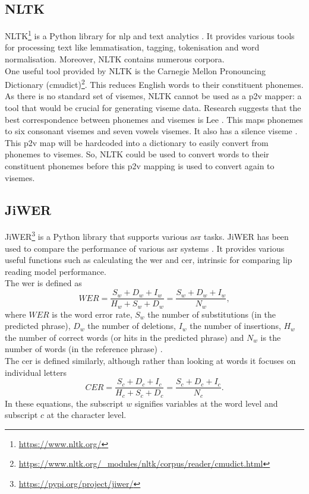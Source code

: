 \subsection{NLTK}
\label{sec: nltk}
NLTK\footnote{\url{https://www.nltk.org/}} is a Python library for \acrlong{nlp} and text analytics \cite{nltk_info}. It provides various tools for processing text like lemmatisation, tagging, tokenisation and word normalisation. Moreover, NLTK contains numerous \gls{corpora}.\\
One useful tool provided by NLTK is the Carnegie Mellon Pronouncing Dictionary (cmudict)\footnote{\url{https://www.nltk.org/_modules/nltk/corpus/reader/cmudict.html}}. This reduces English words to their constituent \gls{phoneme}s.\\
As there is no standard set of \gls{viseme}s, NLTK cannot be used as a \acrfull{p2v} mapper: a tool that would be crucial for generating \gls{viseme} data. Research suggests \cite{phoneme_viseme_mapping_review} that the best correspondence between \gls{phoneme}s and \gls{viseme}s is Lee \cite{best_phoneme_viseme_mapping}. This maps \gls{phoneme}s to six consonant \gls{viseme}s and seven vowels \gls{viseme}s. It also has a silence \gls{viseme} \cite{best_phoneme_viseme_mapping}. This \acrshort{p2v} map will be hardcoded into a dictionary to easily convert from \gls{phoneme}s to \gls{viseme}s. So, NLTK could be used to convert words to their constituent \gls{phoneme}s before this \acrshort{p2v} mapping is used to convert again to \gls{viseme}s.
\subsection{JiWER}
\label{sec: JiWER}
JiWER\footnote{\url{https://pypi.org/project/jiwer/}} is a Python library that supports various \acrfull{asr} tasks. JiWER has been used to compare the performance of various \acrshort{asr} systems \cite{jiwer_example}. It provides various useful functions such as calculating the \acrfull{wer} and \acrfull{cer}, intrinsic for comparing lip reading model performance.\\
The \acrshort{wer} is defined as 
\[WER = \frac{S_w + D_w + I_w}{H_w + S_w + D_w} = \frac{S_w + D_w + I_w}{N_w},\]
where $WER$ is the word error rate, $S_w$ the number of substitutions (in the predicted phrase), $D_w$ the number of deletions, $I_w$ the number of insertions, $H_w$ the number of correct words (or hits in the predicted phrase) and $N_w$ is the number of words (in the reference phrase) \cite{jiwer_example}.\\
The \acrshort{cer} is defined similarly, although rather than looking at words it focuses on individual letters
\[CER = \frac{S_c + D_c + I_c}{H_c + S_c + D_c} = \frac{S_c + D_c + I_c}{N_c}.\]
In these equations, the subscript $w$ signifies variables at the word level and subscript $c$ at the character level.
